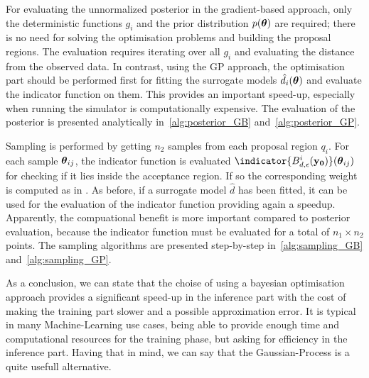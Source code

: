 \noindent
For evaluating the unnormalized posterior in the gradient-based
approach, only the deterministic functions $g_i$ and the prior
distribution $p(\boldsymbol{\theta})$ are required; there is no need for solving
the optimisation problems and building the proposal regions. The
evaluation requires iterating over all $g_i$ and evaluating the
distance from the observed data. In contrast, using the GP approach,
the optimisation part should be performed first for fitting the
surrogate models $\hat{d}_i(\boldsymbol{\theta})$ and evaluate the indicator
function on them. This provides an important speed-up, especially when
running the simulator is computationally expensive. The evaluation of
the posterior is presented analytically in~\ref{alg:posterior_GB}
and~\ref{alg:posterior_GP}.

\noindent
Sampling is performed by getting $n_2$ samples from each proposal
region $q_i$. For each sample $\boldsymbol{\theta}_{ij}$, the indicator function
is evaluated $\indicator{\regioni(\data)}(\thetab_{ij})$ for checking
if it lies inside the acceptance region. If so the corresponding
weight is computed as in \cite{eq:sampling}. As before, if a surrogate
model $\hat{d}$ has been fitted, it can be used for the evaluation of
the indicator function providing again a speedup. Apparently, the
compuational benefit is more important compared to posterior
evaluation, because the indicator function must be evaluated for a
total of $n_1 \times n_2$ points. The sampling algorithms are
presented step-by-step in~\ref{alg:sampling_GB}
and~\ref{alg:sampling_GP}.

\noindent
As a conclusion, we can state that the choise of using a bayesian
optimisation approach provides a significant speed-up in the inference
part with the cost of making the training part slower and a possible
approximation error. It is typical in many Machine-Learning use cases,
being able to provide enough time and computational resources for the
training phase, but asking for efficiency in the inference
part. Having that in mind, we can say that the Gaussian-Process is a
quite usefull alternative.

